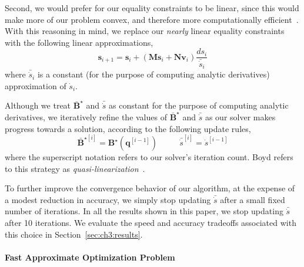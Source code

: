 
Second, we would prefer for our equality constraints to be linear, since this would make more of our problem convex, and therefore more computationally efficient~\cite{boyd:2008}.
With this reasoning in mind, we replace our \emph{nearly} linear equality constraints with the following linear approximations,
%
\begin{equation}
\mathbf{s}_{i+1} = \mathbf{s}_{i} + (\mathbf{M}\mathbf{s}_{i} + \mathbf{N}\mathbf{v}_{i}) \frac{ds_i}{\bar{\dot{s}}_i}
\end{equation}
%
where $\bar{\dot{s}}_i$ is a constant (for the purpose of computing analytic derivatives) approximation of $\dot{s}_i$.

Although we treat $\bar{\mathbf{B}}^{\star}$ and $\bar{\dot{s}}$ as constant for the purpose of computing analytic derivatives, we iteratively refine the values of $\bar{\mathbf{B}}^{\star}$ and $\bar{\dot{s}}$ as our solver makes progress towards a solution, according to the following update rules,
%
\begin{equation}
\bar{\mathbf{B}}^{\star [i]} = \mathbf{B}^{\star}(\mathbf{q}^{[i-1]}) ~~~~~~~~~~~~ \bar{\dot{s}}^{[i]} = \dot{s}^{[i-1]}
\end{equation}
%
where the superscript notation refers to our solver's iteration count.
Boyd refers to this strategy as \emph{quasi-linearization}~.

To further improve the convergence behavior of our algorithm, at the expense of a modest reduction in accuracy, we simply stop updating $\bar{\dot{s}}$ after a small fixed number of iterations.
In all the results shown in this paper, we stop updating $\bar{\dot{s}}$ after 10 iterations.
We evaluate the speed and accuracy tradeoffs associated with this choice in Section~\ref{sec:ch3:results}.

\paragraph{Fast Approximate Optimization Problem}

